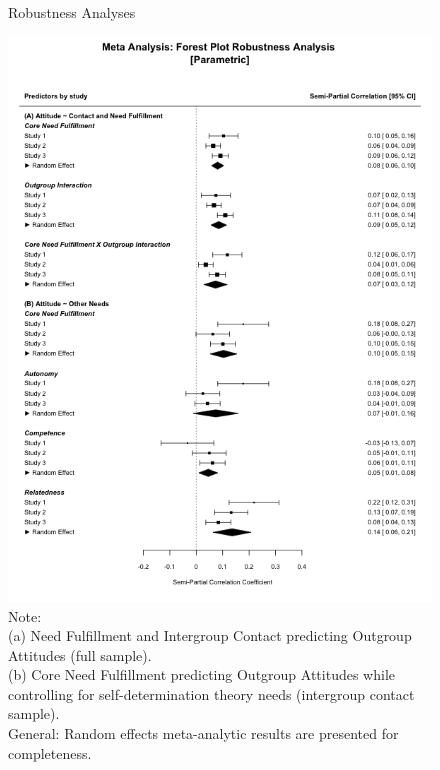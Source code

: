 \documentclass[man, 12pt, a4paper, mask]{apa7}
\theoremstyle{break}
\theoremstyle{plain}
\begin{document}
\begin{figure}
  \caption{Robustness Analyses}
  \label{fig:Robustness}
  \centering\includegraphics[width=\textwidth]{Figures/forestParametricRobustnessComb.png}
  \caption*{Note: \\
  (a) Need Fulfillment and Intergroup Contact predicting Outgroup Attitudes (full sample).\\
  (b) Core Need Fulfillment predicting Outgroup Attitudes while controlling for self-determination theory needs (intergroup contact sample).\\
  General: Random effects meta-analytic results are presented for completeness.}
\end{figure}
\end{document}
